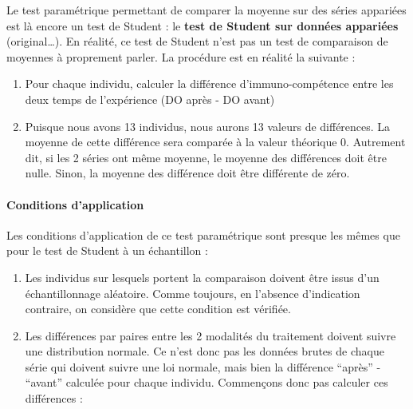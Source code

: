 \documentclass[a4paperpaper,]{article}
\newenvironment{Shaded}{\begin{snugshade}}{\end{snugshade}}
\newcommand{\DataTypeTok}[1]{\textcolor[rgb]{0.00,0.34,0.68}{#1}}
\newcommand{\KeywordTok}[1]{\textcolor[rgb]{0.12,0.11,0.11}{\textbf{#1}}}
\newcommand{\NormalTok}[1]{\textcolor[rgb]{0.12,0.11,0.11}{#1}}
\newcommand{\OperatorTok}[1]{\textcolor[rgb]{0.12,0.11,0.11}{#1}}
\newcommand{\StringTok}[1]{\textcolor[rgb]{0.75,0.01,0.01}{#1}}
\providecommand{\tightlist}{%
  \setlength{\itemsep}{0pt}\setlength{\parskip}{0pt}}
\let\oldparagraph\paragraph
\renewcommand{\paragraph}[1]{\oldparagraph{#1}\mbox{}}
\begin{document}
Le test paramétrique permettant de comparer la moyenne sur des séries appariées est là encore un test de Student : le \textbf{test de Student sur données appariées} (original\ldots{}). En réalité, ce test de Student n'est pas un test de comparaison de moyennes à proprement parler. La procédure est en réalité la suivante :

\begin{enumerate}
\def\labelenumi{\arabic{enumi}.}
\tightlist
\item
  Pour chaque individu, calculer la différence d'immuno-compétence entre les deux temps de l'expérience (DO après - DO avant)
\item
  Puisque nous avons 13 individus, nous aurons 13 valeurs de différences. La moyenne de cette différence sera comparée à la valeur théorique 0. Autrement dit, si les 2 séries ont même moyenne, le moyenne des différences doit être nulle. Sinon, la moyenne des différence doit être différente de zéro.
\end{enumerate}

\hypertarget{conditions-dapplication-1}{%
\paragraph{Conditions d'application}\label{conditions-dapplication-1}}

Les conditions d'application de ce test paramétrique sont presque les mêmes que pour le test de Student à un échantillon :

\begin{enumerate}
\def\labelenumi{\arabic{enumi}.}
\tightlist
\item
  Les individus sur lesquels portent la comparaison doivent être issus d'un échantillonnage aléatoire. Comme toujours, en l'absence d'indication contraire, on considère que cette condition est vérifiée.
\item
  Les différences par paires entre les 2 modalités du traitement doivent suivre une distribution normale. Ce n'est donc pas les données brutes de chaque série qui doivent suivre une loi normale, mais bien la différence ``après'' - ``avant'' calculée pour chaque individu. Commençons donc pas calculer ces différences :
\end{enumerate}

\begin{Shaded}
\end{Shaded}
\end{document}
